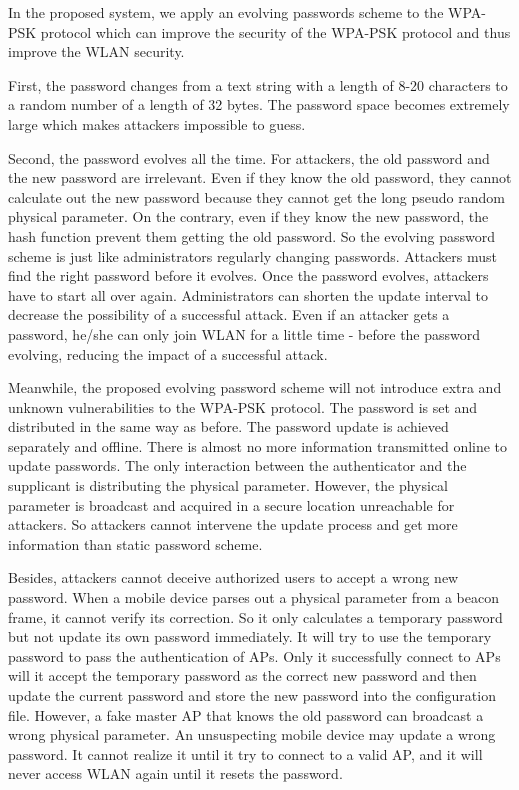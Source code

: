 In the proposed system, we apply an evolving passwords scheme to the WPA-PSK protocol which can improve the security of the WPA-PSK protocol and thus improve the WLAN security. 

First, the password changes from a text string with a length of 8-20 characters to a random number of a length of 32 bytes. The password space becomes extremely large which makes attackers impossible to guess. 

Second, the password evolves all the time. For attackers, the old password and the new password are irrelevant. Even if they know the old password, they cannot calculate out the new password because they cannot get the long pseudo random physical parameter. On the contrary, even if they know the new password, the hash function prevent them getting the old password. So the evolving password scheme is just like administrators regularly changing passwords. Attackers must find the right password before it evolves. Once the password evolves, attackers have to start all over again. Administrators can shorten the update interval to decrease the possibility of a successful attack. Even if an attacker gets a password, he/she can only join WLAN for a little time - before the password evolving, reducing the impact of a successful attack. 

Meanwhile, the proposed evolving password scheme will not introduce extra and unknown vulnerabilities to the WPA-PSK protocol. The password is set and distributed in the same way as before. The password update is achieved separately and offline. There is almost no more information transmitted online to update passwords. The only interaction between the authenticator and the supplicant is distributing the physical parameter. However, the physical parameter is broadcast and acquired in a secure location unreachable for attackers. So attackers cannot intervene the update process and get more information than static password scheme. 

Besides, attackers cannot deceive authorized users to accept a wrong new password. When a mobile device parses out a physical parameter from a beacon frame, it cannot verify its correction. So it only calculates a temporary password but not update its own password immediately. It will try to use the temporary password to pass the authentication of APs. Only it successfully connect to APs will it accept the temporary password as the correct new password and then update the current password and store the new password into the configuration file. However, a fake master AP that knows the old password can broadcast a wrong physical parameter. An unsuspecting mobile device may update a wrong password. It cannot realize it until it try to connect to a valid AP, and it will never access WLAN again until it resets the password. 
